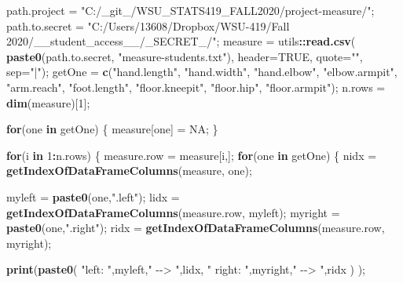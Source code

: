 \documentclass[]{article}
\newenvironment{Shaded}{\begin{snugshade}}{\end{snugshade}}
\newcommand{\ControlFlowTok}[1]{\textcolor[rgb]{0.13,0.29,0.53}{\textbf{#1}}}
\newcommand{\DataTypeTok}[1]{\textcolor[rgb]{0.13,0.29,0.53}{#1}}
\newcommand{\DecValTok}[1]{\textcolor[rgb]{0.00,0.00,0.81}{#1}}
\newcommand{\KeywordTok}[1]{\textcolor[rgb]{0.13,0.29,0.53}{\textbf{#1}}}
\newcommand{\NormalTok}[1]{#1}
\newcommand{\OperatorTok}[1]{\textcolor[rgb]{0.81,0.36,0.00}{\textbf{#1}}}
\newcommand{\OtherTok}[1]{\textcolor[rgb]{0.56,0.35,0.01}{#1}}
\newcommand{\StringTok}[1]{\textcolor[rgb]{0.31,0.60,0.02}{#1}}
\begin{document}
\begin{Shaded}
\begin{Highlighting}[]
\NormalTok{path.project =}\StringTok{ "C:/\_git\_/WSU\_STATS419\_FALL2020/project{-}measure/"}\NormalTok{;}
\NormalTok{path.to.secret =}\StringTok{ "C:/Users/13608/Dropbox/WSU{-}419/Fall 2020/\_\_student\_access\_\_/\_SECRET\_/"}\NormalTok{;}
\NormalTok{measure =}\StringTok{ }\NormalTok{utils}\OperatorTok{::}\KeywordTok{read.csv}\NormalTok{( }\KeywordTok{paste0}\NormalTok{(path.to.secret, }\StringTok{"measure{-}students.txt"}\NormalTok{), }\DataTypeTok{header=}\OtherTok{TRUE}\NormalTok{, }\DataTypeTok{quote=}\StringTok{""}\NormalTok{, }\DataTypeTok{sep=}\StringTok{"|"}\NormalTok{);}
\NormalTok{getOne =}\StringTok{ }\KeywordTok{c}\NormalTok{(}\StringTok{"hand.length"}\NormalTok{, }\StringTok{"hand.width"}\NormalTok{, }\StringTok{"hand.elbow"}\NormalTok{, }\StringTok{"elbow.armpit"}\NormalTok{, }\StringTok{"arm.reach"}\NormalTok{, }\StringTok{"foot.length"}\NormalTok{, }\StringTok{"floor.kneepit"}\NormalTok{, }\StringTok{"floor.hip"}\NormalTok{, }\StringTok{"floor.armpit"}\NormalTok{);}
\NormalTok{n.rows =}\StringTok{ }\KeywordTok{dim}\NormalTok{(measure)[}\DecValTok{1}\NormalTok{];}


\ControlFlowTok{for}\NormalTok{(one }\ControlFlowTok{in}\NormalTok{ getOne)}
\NormalTok{  \{}
\NormalTok{  measure[one] =}\StringTok{ }\OtherTok{NA}\NormalTok{;}
\NormalTok{  \}}
  
\ControlFlowTok{for}\NormalTok{(i }\ControlFlowTok{in} \DecValTok{1}\OperatorTok{:}\NormalTok{n.rows)}
\NormalTok{  \{  }
\NormalTok{  measure.row =}\StringTok{ }\NormalTok{measure[i,];}
  \ControlFlowTok{for}\NormalTok{(one }\ControlFlowTok{in}\NormalTok{ getOne)}
\NormalTok{    \{}
\NormalTok{    nidx =}\StringTok{ }\KeywordTok{getIndexOfDataFrameColumns}\NormalTok{(measure, one);}
    
\NormalTok{    myleft =}\StringTok{ }\KeywordTok{paste0}\NormalTok{(one,}\StringTok{".left"}\NormalTok{);}
\NormalTok{      lidx =}\StringTok{ }\KeywordTok{getIndexOfDataFrameColumns}\NormalTok{(measure.row, myleft);}
\NormalTok{    myright =}\StringTok{ }\KeywordTok{paste0}\NormalTok{(one,}\StringTok{".right"}\NormalTok{);}
\NormalTok{      ridx =}\StringTok{ }\KeywordTok{getIndexOfDataFrameColumns}\NormalTok{(measure.row, myright);}
    
      \KeywordTok{print}\NormalTok{(}\KeywordTok{paste0}\NormalTok{(}
                  \StringTok{"left: "}\NormalTok{,myleft,}\StringTok{" {-}{-}\textgreater{} "}\NormalTok{,lidx,}
                  \StringTok{" right: "}\NormalTok{,myright,}\StringTok{" {-}{-}\textgreater{} "}\NormalTok{,ridx}
\NormalTok{                  )}
\NormalTok{            );}
      

\end{Highlighting}
\end{Shaded}
\end{document}
